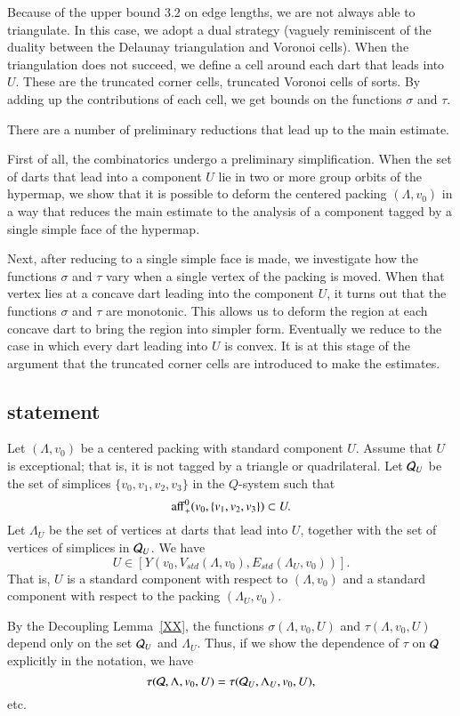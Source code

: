 Because of the upper bound $3.2$ on edge lengths, we are not always
able to triangulate.  In this case, we adopt a dual strategy (vaguely
reminiscent of the duality between the Delaunay triangulation and
Voronoi cells).  When the triangulation does not succeed, we define
a cell around each dart that leads into $U$.  These are the truncated
corner cells, truncated Voronoi cells of sorts.  By adding up the 
contributions of each cell, we get bounds on the functions $\sigma$ and
$\tau$.

There are a number of preliminary reductions that lead up to the
main estimate. 

First of all, the combinatorics undergo a preliminary simplification.
When the set of darts that lead into a component $U$ lie in
two or more group orbits of the hypermap, we show that it is possible
to deform the centered packing $(\Lambda,v_0)$ in a way that
reduces the main estimate to the analysis of a component tagged
by a single simple face of the hypermap.

Next, after reducing to a single simple face is made, we investigate
how the functions $\sigma$ and $\tau$ vary when a single vertex
of the packing is moved.  When that vertex lies at a concave dart
leading into the component $U$, it turns out that the functions $\sigma$ and
$\tau$ are monotonic. This allows us to deform the region at each
concave dart to bring the region into simpler form.  Eventually 
we reduce to the case in which every dart leading into $U$ 
is convex.  It is at this stage of the argument that the truncated
corner cells are introduced to make the estimates.

\subsection{statement}

Let $(\Lambda,v_0)$ be a centered packing with standard component
$U$.  Assume that $U$ is exceptional; that is, it is not tagged
by a triangle or quadrilateral.  Let ${\mathcal Q}_U$ be the set of
simplices $\{v_0,v_1,v_2,v_3\}$ in the $Q$-system such that
$$
{\operatorname{aff}}_+^0(v_0,\{v_1,v_2,v_3\})\subset U.
$$
Let $\Lambda_U$ be the set of vertices at darts that lead into $U$,
together with the set of vertices of simplices in ${\mathcal Q}_U$.
We have 
   $$U\in[Y(v_0,V_{std}(\Lambda,v_0),E_{std}(\Lambda_U,v_0))].$$
That is, $U$ is a standard component with respect to $(\Lambda,v_0)$
and a standard component with respect to the packing $(\Lambda_U,v_0)$.

By the Decoupling Lemma~\ref{XX}, the functions $\sigma(\Lambda,v_0,U)$
and $\tau(\Lambda,v_0,U)$ depend only on the set ${\mathcal Q}_U$ 
and $\Lambda_U$.  Thus, if we show the dependence of $\tau$
on ${\mathcal Q}$ explicitly in the notation, we have
  $$\tau({\mathcal Q},\Lambda,v_0,U) = \tau({\mathcal Q}_U,\Lambda_U,v_0,U),$$
etc.  

